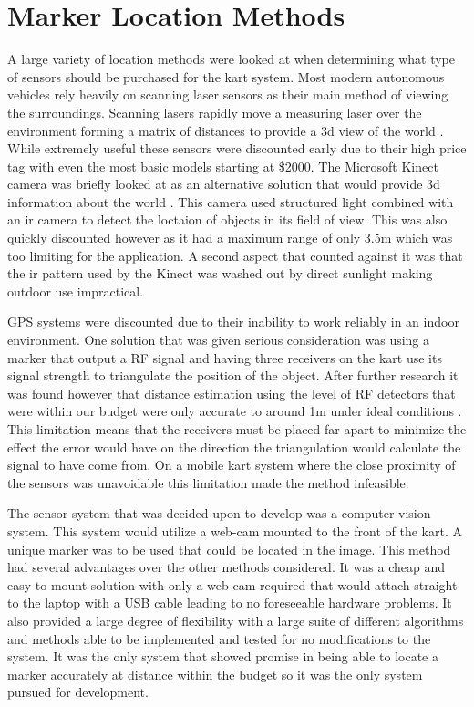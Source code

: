 \section{Marker Location Methods}

A large variety of location methods were looked at when determining what type of sensors should be purchased for the kart system. Most modern autonomous vehicles rely heavily on scanning laser sensors as their main method of viewing the surroundings. Scanning lasers rapidly move a measuring laser over the environment forming a matrix of distances to provide a 3d view of the world \cite{laser}. While extremely useful these sensors were discounted early due to their high price tag with even the most basic models starting at \$2000. The Microsoft Kinect camera was briefly looked at as an alternative solution that would provide 3d information about the world \cite{kinect}. This camera used structured light combined with an ir camera to detect the loctaion of objects in its field of view. This was also quickly discounted however as it had a maximum range of only 3.5m which was too limiting for the application. A second aspect that counted against it was that the ir pattern used by the Kinect was washed out by direct sunlight making outdoor use impractical.

GPS systems were discounted due to their inability to work reliably in an indoor environment. One solution that was given serious consideration was using a marker that output a RF signal and having three receivers on the kart use its signal strength to triangulate the position of the object. After further research it was found however that distance estimation using the level of RF detectors that were within our budget were only accurate to around 1m under ideal conditions \cite{rf}. This limitation means that the receivers must be placed far apart to minimize the effect the error would have on the direction the triangulation would calculate the signal to have come from. On a mobile kart system where the close proximity of the sensors was unavoidable this limitation made the method infeasible.

The sensor system that was decided upon to develop was a computer vision system. This system would utilize a web-cam mounted to the front of the kart. A unique marker was to be used that could be located in the image. This method had several advantages over the other methods considered. It was a cheap and easy to mount solution with only a web-cam required that would attach straight to the laptop with a USB cable leading to no foreseeable hardware problems. It also provided a large degree of flexibility with a large suite of different algorithms and methods able to be implemented and tested for no modifications to the system. It was the only system that showed promise in being able to locate a marker accurately at distance within the budget so it was the only system pursued for development.